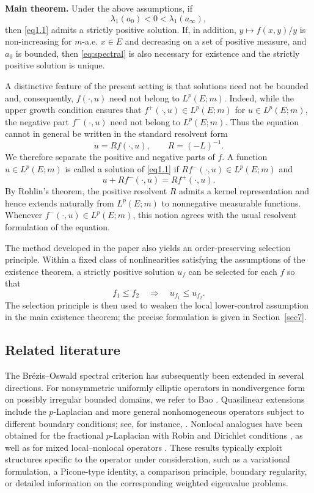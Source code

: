 \documentclass[11pt,a4paper,reqno]{amsart}
\theoremstyle{definition}
\numberwithin{equation}{section}
\begin{document}
\medskip
\noindent
\textbf{Main theorem.}
Under the above assumptions, if
\begin{equation}\label{eq:spectral}
    \lambda_1(a_0)<0<\lambda_1(a_\infty),
\end{equation}
then \eqref{eq1.1} admits a strictly positive solution.
If, in addition, $y\mapsto f(x,y)/y$ is  non-increasing for
$m$-a.e. $x\in E$ and decreasing on a set of positive measure,  and $a_0$ is bounded, then \eqref{eq:spectral}
is also necessary for existence and the strictly positive solution is
unique.

A distinctive feature of the present setting is that solutions need not
be bounded and, consequently, $f(\cdot,u)$ need not belong to
$L^p(E;m)$. Indeed, while the upper growth condition ensures that
$f^+(\cdot,u)\in L^p(E;m)$ for $u\in L^p(E;m)$, the negative part
$f^-(\cdot,u)$ need not belong to $L^p(E;m)$. Thus the equation
cannot in general be written in the standard resolvent form
\[
u=Rf(\cdot,u),
\qquad R=(-L)^{-1}.
\]
We therefore separate the positive and negative parts of $f$. A function
$u\in L^p(E;m)$ is called a solution of \eqref{eq1.1} if
$Rf^-(\cdot,u)\in L^p(E;m)$ and
\[
u+Rf^-(\cdot,u)=Rf^+(\cdot,u).
\]
By Rohlin's theorem, the positive resolvent $R$ admits a kernel
representation and hence extends naturally from $L^p(E;m)$ to
nonnegative measurable functions. Whenever
$f^-(\cdot,u)\in L^p(E;m)$, this notion agrees with the usual resolvent
formulation of the equation.

The method developed in the paper also yields an order-preserving selection principle. 
Within a fixed class of nonlinearities satisfying the assumptions of the existence theorem, a strictly positive solution
$u_f$ can be selected for each $f$ so that
\[
f_1\le f_2\quad\Longrightarrow\quad u_{f_1}\le u_{f_2}.
\]
The selection
principle is then used to weaken the local lower-control assumption in the
main existence theorem; the precise formulation is given in
Section~\ref{sec7}.


\subsection{Related literature}
The Br\'ezis--Oswald spectral criterion has subsequently been extended in
several directions. For nonsymmetric uniformly elliptic operators in
nondivergence form on possibly irregular bounded domains, we refer to Bao
\cite{Bao2003}. Quasilinear extensions include the $p$-Laplacian and more
general nonhomogeneous operators subject to different boundary conditions;
see, for instance,
\cite{DiazSaa1987,FragnelliMugnaiPapageorgiou2016}. Nonlocal analogues have
been obtained for the fractional $p$-Laplacian with Robin and Dirichlet
conditions
\cite{MugnaiPinamontiVecchi2020,IannizzottoMugnai2024}, as well as for mixed
local--nonlocal operators \cite{BiagiMugnaiVecchi2024}. These results
typically exploit structures specific to the operator under consideration,
such as a variational formulation, a Picone-type identity, a comparison
principle, boundary regularity, or detailed information on the corresponding
weighted eigenvalue problems.
\end{document}
